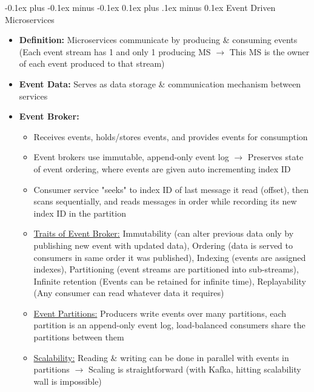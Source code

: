 \documentclass[landscape]{article}
\makeatletter
\renewcommand{\subsection}{\@startsection{subsection}{2}{0mm}%
  {-0.1ex plus -0.1ex minus -0.1ex}%
  {0.1ex plus .1ex minus 0.1ex}%
{\normalfont\scriptsize\bfseries}}
\makeatother
\begin{document}
\begin{multicols*}{5}
    \subsection{Event Driven Microservices}
    \begin{itemize}
      \item \textbf{Definition:} Microservices communicate by producing \& consuming events (Each event stream has 1 and only 1 producing MS $\rightarrow$ This MS is the owner of each event produced to that stream)
      \item \textbf{Event Data:} Serves as data storage \& communication mechanism between services
      \item \textbf{Event Broker:} 
      \begin{itemize}
        \item Receives events, holds/stores events, and provides events for consumption
        \item Event brokers use immutable, append-only event log $\rightarrow$ Preserves state of event ordering, where events are given auto incrementing index ID
        \item Consumer service "seeks" to index ID of last message it read (offset), then scans sequentially, and reads messages in order while recording its new index ID in the partition
        \item \underline{Traits of Event Broker:} Immutability (can alter previous data only by publishing new event with updated data), Ordering (data is served to consumers in same order it was published), Indexing (events are assigned indexes), Partitioning (event streams are partitioned into sub-streams), Infinite retention (Events can be retained for infinite time), Replayability (Any consumer can read whatever data it requires)
        \item \underline{Event Partitions:} Producers write events over many partitions, each partition is an append-only event log, load-balanced consumers share the partitions between them
        \item \underline{Scalability:} Reading \& writing can be done in parallel with events in partitions $\rightarrow$ Scaling is straightforward (with Kafka, hitting scalability wall is impossible)
      \end{itemize}
    \end{itemize}
\end{multicols*}
\end{document}
